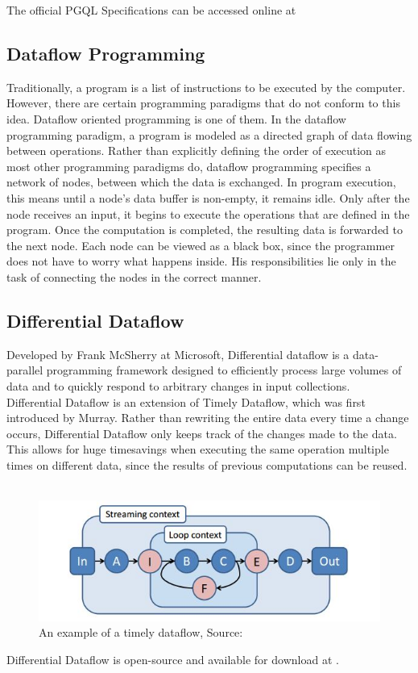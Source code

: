 \documentclass[11pt,singlecolumn]{scrartcl}
\begin{document}
\noindent The official PGQL Specifications can be accessed online at \cite{PGQLSpec}

\subsection{Dataflow Programming}
Traditionally, a program is a list of instructions to be executed by the computer. However, there are certain programming paradigms that do not conform to this idea. Dataflow oriented programming is one of them. In the dataflow programming paradigm, a program is modeled as a directed graph of data flowing between operations.  Rather than explicitly defining the order of execution as most other programming paradigms do, dataflow programming specifies a network of nodes, between which the data is exchanged. In program execution, this means until a node's data buffer is non-empty, it remains idle. Only after the node receives an input, it begins to execute the operations that are defined in the program. Once the computation is completed, the resulting data is forwarded to the next node. Each node can be viewed as a black box, since the programmer does not have to worry what happens inside. His responsibilities lie only in the task of connecting the nodes in the correct manner.


\subsection{Differential Dataflow}

Developed by Frank McSherry at Microsoft, Differential dataflow is a data-parallel programming framework designed to efficiently process large volumes of data and to quickly respond to arbitrary changes in input collections.\cite{Differential}\\
Differential Dataflow is an extension of Timely Dataflow, which was first introduced by Murray. \cite{GitTimely}
Rather than rewriting the entire data every time a change occurs, Differential Dataflow only keeps track of the changes made to the data. This allows for huge timesavings when executing the same operation multiple times on different data, since the results of previous computations can be reused.\\\\
\begin{figure}[H]
\includegraphics[width=1\textwidth]{dataflow_example}
\caption[Timely Dataflow Example]{An example of a timely dataflow, Source:\protect\cite{Naiad}}
\end{figure}
Differential Dataflow is open-source and available for download at \cite{GitDiff}.
\end{document}
